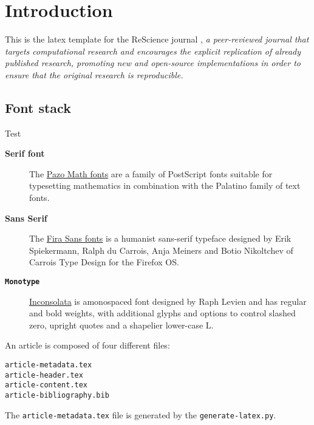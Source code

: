 \section{Introduction}

This is the latex template for the ReScience journal
\citep{Rougier:2017}, {\em a peer-reviewed
journal that targets computational research and encourages the explicit
replication of already published research, promoting new and open-source
implementations in order to ensure that the original research is
reproducible.}\\


\subsection*{Font stack}
Test
\begin{description}
\item[{\bfseries Serif font}] The
  \href{http://www.tug.dk/FontCatalogue/urwpalladio}{Pazo Math fonts} are a
  family of PostScript fonts suitable for typesetting mathematics in
  combination with the Palatino family of text fonts.
\item[{\sf \bfseries Sans Serif}] The
  \href{http://www.tug.dk/FontCatalogue/firasans/}{Fira Sans fonts} is a
  humanist sans-serif typeface designed by Erik Spiekermann, Ralph du Carrois,
  Anja Meiners and Botio Nikoltchev of Carrois Type Design for the Firefox OS.
\item[{\tt \bfseries Monotype}]
  \href{http://www.tug.dk/FontCatalogue/inconsolata/}{Inconsolata} is
  amonospaced font designed by Raph Levien and has regular and bold weights,
  with additional glyphs and options to control slashed zero, upright quotes
  and a shapelier lower-case L.
\end{description}

An article is composed of four different files:
\begin{lstlisting}
article-metadata.tex
article-header.tex
article-content.tex
article-bibliography.bib
\end{lstlisting}


The {\tt article-metadata.tex} file is generated by the {\tt generate-latex.py}.\\


